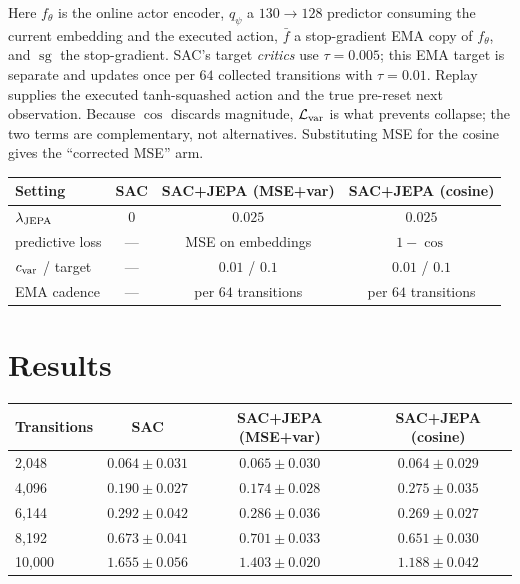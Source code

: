 \documentclass[11pt]{article}
\begin{document}
\noindent
Here $f_\theta$ is the online actor encoder, $q_\psi$ a $130\!\to\!128$ predictor
consuming the current embedding and the executed action, $\bar f$ a
stop-gradient EMA copy of $f_\theta$, and $\operatorname{sg}$ the stop-gradient.
SAC's target \emph{critics} use $\tau=0.005$; this EMA target is separate and
updates once per $64$ collected transitions with $\tau=0.01$. Replay supplies
the executed tanh-squashed action and the true pre-reset next observation.
Because $\cos$ discards magnitude, $\mathcal L_{\rm var}$ is what prevents
collapse; the two terms are complementary, not alternatives. Substituting MSE
for the cosine gives the ``corrected MSE'' arm.

\begin{center}
\begin{tabular}{lccc}
\toprule
\textbf{Setting} & \textbf{SAC} & \textbf{SAC+JEPA (MSE+var)} & \textbf{SAC+JEPA (cosine)} \\
\midrule
$\lambda_{\rm JEPA}$ & $0$ & $0.025$ & $0.025$ \\
predictive loss & --- & MSE on embeddings & $1-\cos$ \\
$c_{\rm var}$ / target & --- & $0.01$ / $0.1$ & $0.01$ / $0.1$ \\
EMA cadence & --- & per $64$ transitions & per $64$ transitions \\
\bottomrule
\end{tabular}
\end{center}

\section{Results}

\begin{center}
\begin{tabular}{lccc}
\toprule
\textbf{Transitions} & \textbf{SAC} & \textbf{SAC+JEPA (MSE+var)} & \textbf{SAC+JEPA (cosine)} \\
\midrule
2{,}048  & $0.064\pm0.031$ & $0.065\pm0.030$ & $0.064\pm0.029$ \\
4{,}096  & $0.190\pm0.027$ & $0.174\pm0.028$ & $0.275\pm0.035$ \\
6{,}144  & $0.292\pm0.042$ & $0.286\pm0.036$ & $0.269\pm0.027$ \\
8{,}192  & $0.673\pm0.041$ & $0.701\pm0.033$ & $0.651\pm0.030$ \\
10{,}000 & $\mathbf{1.655\pm0.056}$ & $\mathbf{1.403\pm0.020}$ & $\mathbf{1.188\pm0.042}$ \\
\bottomrule
\end{tabular}
\end{center}
\end{document}

